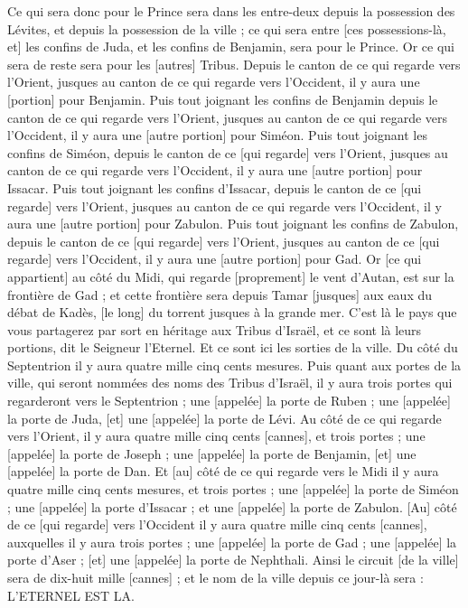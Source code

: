\begin{multicols}{2}
Ce qui sera donc pour le Prince sera dans les entre-deux depuis la possession des Lévites, et depuis la possession de la ville ; ce qui sera entre [ces possessions-là, et] les confins de Juda, et les confins de Benjamin, sera pour le Prince.
Or ce qui sera de reste sera pour les [autres] Tribus. Depuis le canton de ce qui regarde vers l'Orient, jusques au canton de ce qui regarde vers l'Occident, il y aura une [portion] pour Benjamin.
Puis tout joignant les confins de Benjamin depuis le canton de ce qui regarde vers l'Orient, jusques au canton de ce qui regarde vers l'Occident, il y aura une [autre portion] pour Siméon.
Puis tout joignant les confins de Siméon, depuis le canton de ce [qui regarde] vers l'Orient, jusques au canton de ce qui regarde vers l'Occident, il y aura une [autre portion] pour Issacar.
Puis tout joignant les confins d'Issacar, depuis le canton de ce [qui regarde] vers l'Orient, jusques au canton de ce qui regarde vers l'Occident, il y aura une [autre portion] pour Zabulon.
Puis tout joignant les confins de Zabulon, depuis le canton de ce [qui regarde] vers l'Orient, jusques au canton de ce [qui regarde] vers l'Occident, il y aura une [autre portion] pour Gad.
Or [ce qui appartient] au côté du Midi, qui regarde [proprement] le vent d'Autan, est sur la frontière de Gad ; et cette frontière sera depuis Tamar [jusques] aux eaux du débat de Kadès, [le long] du torrent jusques à la grande mer.
C'est là le pays que vous partagerez par sort en héritage aux Tribus d'Israël, et ce sont là leurs portions, dit le Seigneur l'Eternel.
Et ce sont ici les sorties de la ville. Du côté du Septentrion il y aura quatre mille cinq cents mesures.
Puis quant aux portes de la ville, qui seront nommées des noms des Tribus d'Israël, il y aura trois portes qui regarderont vers le Septentrion ; une [appelée] la porte de Ruben ; une [appelée] la porte de Juda, [et] une [appelée] la porte de Lévi.
Au côté de ce qui regarde vers l'Orient, il y aura quatre mille cinq cents [cannes], et trois portes ; une [appelée] la porte de Joseph ; une [appelée] la porte de Benjamin, [et] une [appelée] la porte de Dan.
Et [au] côté de ce qui regarde vers le Midi il y aura quatre mille cinq cents mesures, et trois portes ; une [appelée] la porte de Siméon ; une [appelée] la porte d'Issacar ; et une [appelée] la porte de Zabulon.
[Au] côté de ce [qui regarde] vers l'Occident il y aura quatre mille cinq cents [cannes], auxquelles il y aura trois portes ; une [appelée] la porte de Gad ; une [appelée] la porte d'Aser ; [et] une [appelée] la porte de Nephthali.
Ainsi le circuit [de la ville] sera de dix-huit mille [cannes] ; et le nom de la ville depuis ce jour-là sera : L'ETERNEL EST LA.
\PPE{}
\end{multicols}
